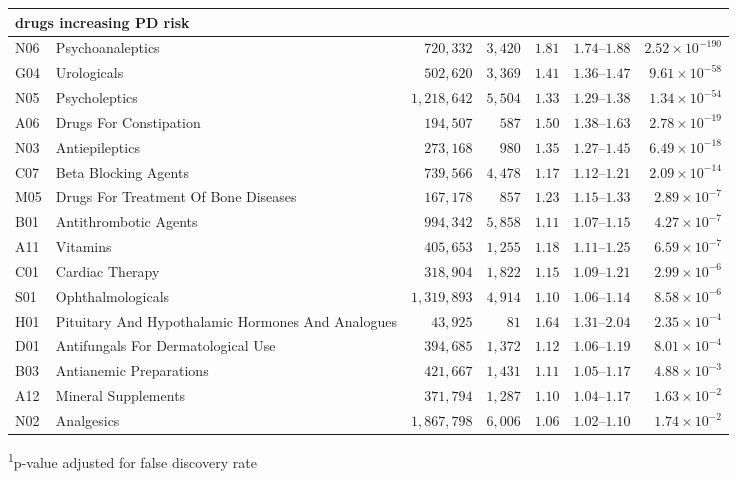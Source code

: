 \begin{longtable}{llrrrrr}
\midrule
\multicolumn{7}{l}{drugs increasing PD risk} \\ 
\midrule
N06 & Psychoanaleptics & $720,332$ & $3,420$ & $1.81$ & $1.74$–$1.88$ & $2.52 \times 10^{-190}$ \\ 
G04 & Urologicals & $502,620$ & $3,369$ & $1.41$ & $1.36$–$1.47$ & $9.61 \times 10^{-58}$ \\ 
N05 & Psycholeptics & $1,218,642$ & $5,504$ & $1.33$ & $1.29$–$1.38$ & $1.34 \times 10^{-54}$ \\ 
A06 & Drugs For Constipation & $194,507$ & $587$ & $1.50$ & $1.38$–$1.63$ & $2.78 \times 10^{-19}$ \\ 
N03 & Antiepileptics & $273,168$ & $980$ & $1.35$ & $1.27$–$1.45$ & $6.49 \times 10^{-18}$ \\ 
C07 & Beta Blocking Agents & $739,566$ & $4,478$ & $1.17$ & $1.12$–$1.21$ & $2.09 \times 10^{-14}$ \\ 
M05 & Drugs For Treatment Of Bone Diseases & $167,178$ & $857$ & $1.23$ & $1.15$–$1.33$ & $2.89 \times 10^{-7}$ \\ 
B01 & Antithrombotic Agents & $994,342$ & $5,858$ & $1.11$ & $1.07$–$1.15$ & $4.27 \times 10^{-7}$ \\ 
A11 & Vitamins & $405,653$ & $1,255$ & $1.18$ & $1.11$–$1.25$ & $6.59 \times 10^{-7}$ \\ 
C01 & Cardiac Therapy & $318,904$ & $1,822$ & $1.15$ & $1.09$–$1.21$ & $2.99 \times 10^{-6}$ \\ 
S01 & Ophthalmologicals & $1,319,893$ & $4,914$ & $1.10$ & $1.06$–$1.14$ & $8.58 \times 10^{-6}$ \\ 
H01 & Pituitary And Hypothalamic Hormones And Analogues & $43,925$ & $81$ & $1.64$ & $1.31$–$2.04$ & $2.35 \times 10^{-4}$ \\ 
D01 & Antifungals For Dermatological Use & $394,685$ & $1,372$ & $1.12$ & $1.06$–$1.19$ & $8.01 \times 10^{-4}$ \\ 
B03 & Antianemic Preparations & $421,667$ & $1,431$ & $1.11$ & $1.05$–$1.17$ & $4.88 \times 10^{-3}$ \\ 
A12 & Mineral Supplements & $371,794$ & $1,287$ & $1.10$ & $1.04$–$1.17$ & $1.63 \times 10^{-2}$ \\ 
N02 & Analgesics & $1,867,798$ & $6,006$ & $1.06$ & $1.02$–$1.10$ & $1.74 \times 10^{-2}$ \\ 
\bottomrule
\end{longtable}
\begin{minipage}{\linewidth}
\textsuperscript{1}p-value adjusted for false discovery rate\\
\end{minipage}

